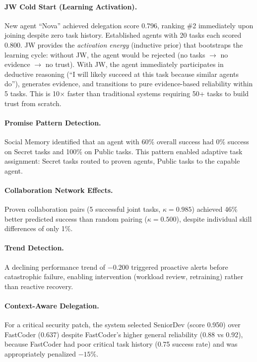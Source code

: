 \documentclass[11pt]{article}
\begin{document}
\paragraph{JW Cold Start (Learning Activation).}
New agent ``Nova'' achieved delegation score 0.796, ranking \#2 immediately
upon joining despite zero task history. Established agents with 20 tasks each
scored 0.800. JW provides the \textit{activation energy} (inductive prior) that
bootstraps the learning cycle: without JW, the agent would be rejected (no
tasks $\rightarrow$ no evidence $\rightarrow$ no trust). With JW, the agent
immediately participates in deductive reasoning (``I will likely succeed at
this task because similar agents do''), generates evidence, and transitions to
pure evidence-based reliability within 5 tasks. This is 10$\times$ faster than
traditional systems requiring 50+ tasks to build trust from scratch.

\paragraph{Promise Pattern Detection.}
Social Memory identified that an agent with 60\% overall success had 0\% success
on Secret tasks and 100\% on Public tasks. This pattern enabled adaptive task
assignment: Secret tasks routed to proven agents, Public tasks to the capable
agent.

\paragraph{Collaboration Network Effects.}
Proven collaboration pairs (5 successful joint tasks, $\kappa=0.985$) achieved
46\% better predicted success than random pairing ($\kappa=0.500$), despite
individual skill differences of only 1\%.

\paragraph{Trend Detection.}
A declining performance trend of $-0.200$ triggered proactive alerts before
catastrophic failure, enabling intervention (workload review, retraining)
rather than reactive recovery.

\paragraph{Context-Aware Delegation.}
For a critical security patch, the system selected SeniorDev (score 0.950)
over FastCoder (0.637) despite FastCoder's higher general reliability (0.88
vs 0.92), because FastCoder had poor critical task history (0.75 success rate)
and was appropriately penalized $-15\%$.
\end{document}
